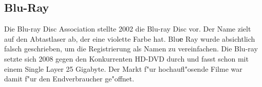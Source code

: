         \subsection{Blu-Ray}
        \label{ch:Technisch:sec:Optische Speicherung:sub:Blu-Ray}
        
            Die Blu-ray Disc Association stellte 2002 die Blu-ray Disc vor. Der Name zielt auf den Abtastlaser ab, der eine violette Farbe hat. Blu\textbf{e} Ray wurde absichtlich falsch geschrieben, um die Registrierung als Namen zu vereinfachen. Die Blu-ray setzte sich 2008 gegen den Konkurrenten HD-DVD durch und fasst schon mit einem Single Layer 25 Gigabyte.\cite{Wojciechowski:bluray} Der Markt f"ur hochaufl"osende Filme war damit f"ur den Endverbraucher ge"offnet.
            \\
           



